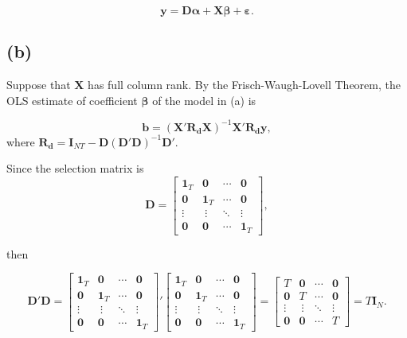 \documentclass[
]{article}
\begin{document}
\[\boldsymbol{y} = \boldsymbol{D\alpha} + \boldsymbol{X}\boldsymbol{\beta} + \boldsymbol{\varepsilon}.\]

\hypertarget{b}{%
\subsection{(b)}\label{b}}

Suppose that \(\boldsymbol{X}\) has full column rank. By the
Frisch-Waugh-Lovell Theorem, the OLS estimate of coefficient
\(\boldsymbol{\beta}\) of the model in (a) is

\[\boldsymbol{b} = (\boldsymbol{X'R_dX})^{-1}\boldsymbol{X'R_dy},\]
where
\(\boldsymbol{R_d} = \boldsymbol{I}_{NT} - \boldsymbol{D}(\boldsymbol{D'D})^{-1}\boldsymbol{D}'\).

Since the selection matrix is
\[\boldsymbol{D} = \begin{bmatrix}\boldsymbol{1}_T & \boldsymbol{0} & \cdots & \boldsymbol{0} \\ \boldsymbol{0} & \boldsymbol{1}_T & \cdots & \boldsymbol{0} \\ \vdots &\ \vdots & \ddots & \vdots \\ \boldsymbol{0} & \boldsymbol{0} & \cdots & \boldsymbol{1}_T\end{bmatrix},\]

then

\[\boldsymbol{D'D} = \begin{bmatrix}\boldsymbol{1}_T & \boldsymbol{0} & \cdots & \boldsymbol{0} \\ \boldsymbol{0} & \boldsymbol{1}_T & \cdots & \boldsymbol{0} \\ \vdots &\ \vdots & \ddots & \vdots \\ \boldsymbol{0} & \boldsymbol{0} & \cdots & \boldsymbol{1}_T\end{bmatrix}' \begin{bmatrix}\boldsymbol{1}_T & \boldsymbol{0} & \cdots & \boldsymbol{0} \\ \boldsymbol{0} & \boldsymbol{1}_T & \cdots & \boldsymbol{0} \\ \vdots &\ \vdots & \ddots & \vdots \\ \boldsymbol{0} & \boldsymbol{0} & \cdots & \boldsymbol{1}_T\end{bmatrix}=\begin{bmatrix}T & \boldsymbol{0} & \cdots & \boldsymbol{0} \\ \boldsymbol{0} & T & \cdots & \boldsymbol{0} \\ \vdots &\ \vdots & \ddots & \vdots \\ \boldsymbol{0} & \boldsymbol{0} & \cdots & T\end{bmatrix}=T\boldsymbol{I}_{N}.\]
\end{document}
